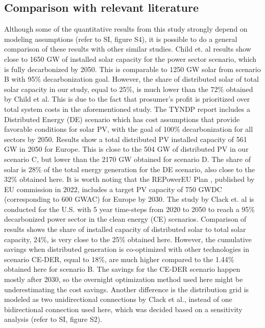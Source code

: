 \documentclass[review]{elsarticle}
\begin{document}
\subsection{Comparison with relevant literature}


Although some of the quantitative results from this study strongly depend on modeling assumptions (refer to SI, figure S4), it is possible to do a general comparison of these results with other similar studies. Child et. al \cite{child_2019} results show close to 1650 GW of installed solar capacity for the power sector scenario, which is fully decarbonized by 2050. This is comparable to 1250 GW solar from scenario B with 95\% decarbonization goal. However, the share of distributed solar of total solar capacity in our study, equal to 25\%, is much lower than the 72\% obtained by Child et al. This is due to the fact that prosumer's profit is prioritized over total system costs in the aforementioned study. The TYNDP report \cite{TYNDP} includes a Distributed Energy (DE) scenario which has cost assumptions that provide favorable conditions for solar PV, with the goal of 100\% decarbonization for all sectors by 2050. Results show a total distributed PV installed capacity of 561 GW in 2050 for Europe. This is close to the 504 GW of distributed PV in our scenario C, but lower than the 2170 GW obtained for scenario D. The share of solar is 28\% of the total energy generation for the DE scenario, also close to the 32\% obtained here. It is worth noting that the REPowerEU Plan  \cite{repowerEU}, published by EU commission in 2022, includes a target PV capacity of 750 GWDC (corresponding to 600 GWAC) for Europe by 2030. The study by Clack et. al \cite{clack_2020} is conducted for the U.S. with 5 year time-steps from 2020 to 2050 to reach a 95\% decarbonized power sector in the clean energy (CE) scenarios. Comparison of results shows the share of installed capacity of distributed solar to total solar capacity, 24\%, is very close to the 25\% obtained here. However, the cumulative savings when distributed generation is co-optimized with other technologies in scenario CE-DER, equal to 18\%, are much higher compared to the 1.44\% obtained here for scenario B. The savings for the CE-DER scenario happen mostly after 2030, so the overnight optimization method used here might be underestimating the cost savings. Another difference is the distribution grid is modeled as two unidirectional connections by Clack et al., instead of one bidirectional connection used here, which was decided based on a sensitivity analysis (refer to SI, figure S2). 
\end{document}
